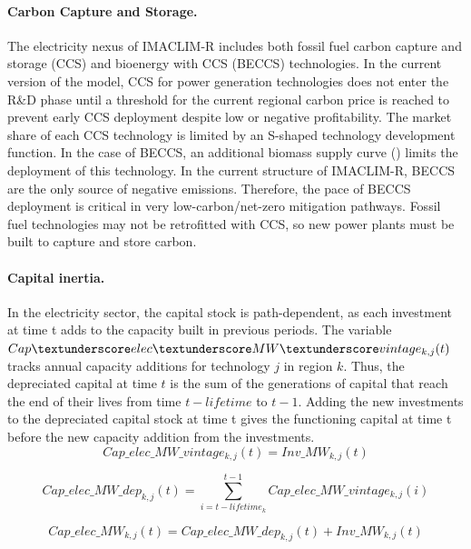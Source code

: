 \paragraph{ Carbon Capture and Storage.}
The electricity nexus of IMACLIM-R includes both fossil fuel carbon capture and storage (CCS) and bioenergy with CCS (BECCS) technologies. In the current version of the model, CCS for power generation technologies does not enter the R\&D phase until a threshold for the current regional carbon price is reached to prevent early CCS deployment despite low or negative profitability. The market share of each CCS technology is limited by an S-shaped technology development function. In the case of BECCS, an additional biomass supply curve (\cite{Hoogwijk2009}) limits the deployment of this technology. In the current structure of IMACLIM-R, BECCS are the only source of negative emissions. Therefore, the pace of BECCS deployment is critical in very low-carbon/net-zero mitigation pathways. Fossil fuel technologies may not be retrofitted with CCS, so new power plants must be built to capture and store carbon.


\paragraph{ Capital inertia.}
In the electricity sector, the capital stock is path-dependent, as each investment at time t adds to the capacity built in previous periods. The variable $Cap\textunderscore elec\textunderscore MW \textunderscore vintage_{k,j}(t)$ tracks annual capacity additions for technology $j$ in region $k$. Thus, the depreciated capital at time $t$ is the sum of the generations of capital that reach the end of their lives from time $t - lifetime$ to $t - 1$. Adding the new investments to the depreciated capital stock at time t gives the functioning capital at time t before the new capacity addition from the investments.
\begin{dmath}
    Cap\_elec\_ MW\_vintage_{k,j}(t) = Inv\_MW_{k,j}(t)
    \label{eqn:Cap_elec_vintage}
\end{dmath}

\begin{dmath}
    Cap\_elec\_MW\_dep_{k,j}(t) = \sum_{i = t - lifetime_{k}}^{t-1}Cap\_elec\_MW\_vintage_{k,j}(i)
    \label{eqn:Cap_elec_dep}
\end{dmath}

\begin{dmath}
    Cap\_elec\_MW_{k,j}(t) = Cap\_elec\_MW\_dep_{k,j}(t) + Inv\_MW_{k,j}(t)
    \label{eqn:Cap_elec}
\end{dmath}




